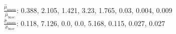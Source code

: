 $\frac{\hat\mu_{anom}}{\hat\mu_{base}}$: 0.388, 2.105, 1.421, 3.23, 1.765, 0.03, 0.004, 0.009\\$\frac{\hat\sigma_{anom}}{\hat\sigma_{base}}$: 0.118, 7.126, 0.0, 0.0, 5.168, 0.115, 0.027, 0.027